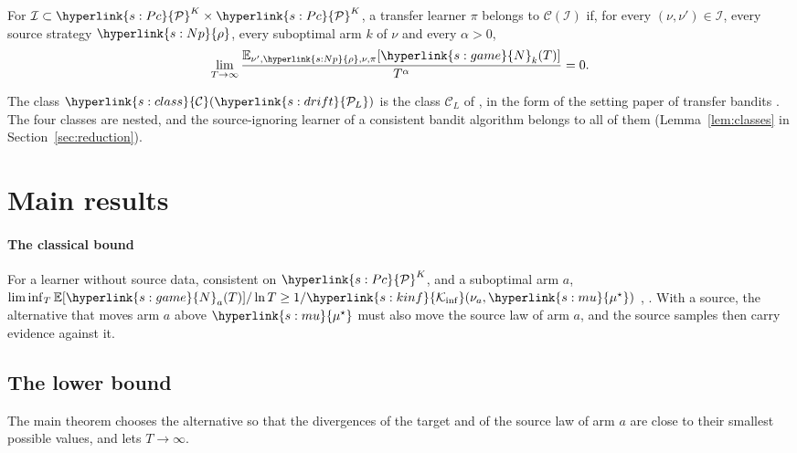 \documentclass[11pt]{article}
\newcommand{\dt}[1]{\hypertarget{#1}{}}
\newcommand{\sy}[2]{\hyperlink{#1}{#2}}
\newcommand{\E}{\mathbb{E}}
\newcommand{\Pc}{\sy{s:Pc}{\mathcal{P}}}
\newcommand{\Kinf}{\sy{s:kinf}{\mathcal{K}_{\inf}}}
\newcommand{\ms}{\sy{s:mu}{\mu^{\star}}}
\newcommand{\rhos}{\sy{s:Np}{\rho}}
\newcommand{\Nc}{\sy{s:game}{N}}
\newcommand{\PcL}{\sy{s:drift}{\mathcal{P}_{L}}}
\newcommand{\Cl}{\sy{s:class}{\mathcal{C}}}
\begin{document}
\begin{definition}\label{def:class}
For $\mathcal I\subset\Pc^K\times\Pc^K$, a transfer learner $\pi$ belongs to\dt{s:class}
$\mathcal C(\mathcal I)$ if, for every $(\nu,\nu')\in\mathcal I$, every source strategy $\rhos$,
every suboptimal arm $k$ of $\nu$ and every $\alpha>0$,
\begin{equation*}
\lim_{T\to\infty}\frac{\E_{\nu',\rhos,\nu,\pi}[\Nc_k(T)]}{T^{\alpha}}=0.
\end{equation*}
\end{definition}

The class $\Cl(\PcL)$ is the class $\mathcal C_L$ of \citet[Section~4.2]{PMRM26}, in the form of
the setting paper of transfer bandits \citep[Definition~3.9]{INC-P003}. The four classes are nested,
and the source-ignoring learner of a consistent bandit algorithm belongs to all of them
(Lemma~\ref{lem:classes} in Section~\ref{sec:reduction}).

\section{Main results}\label{sec:main}

\paragraph{The classical bound} For a learner without source data, consistent on $\Pc^K$, and a
suboptimal arm $a$, $\liminf_T\E[\Nc_a(T)]/\ln T\ge1/\Kinf(\nu_a,\ms)$ \citep{LR85,BK96},
\citep[Theorem~1]{GMS19}. With a source, the alternative that moves arm $a$ above $\ms$ must also
move the source law of arm $a$, and the source samples then carry evidence against it.

\subsection{The lower bound}

The main theorem chooses the alternative so that the divergences of the target and of the source
law of arm $a$ are close to their smallest possible values, and lets $T\to\infty$.
\end{document}
